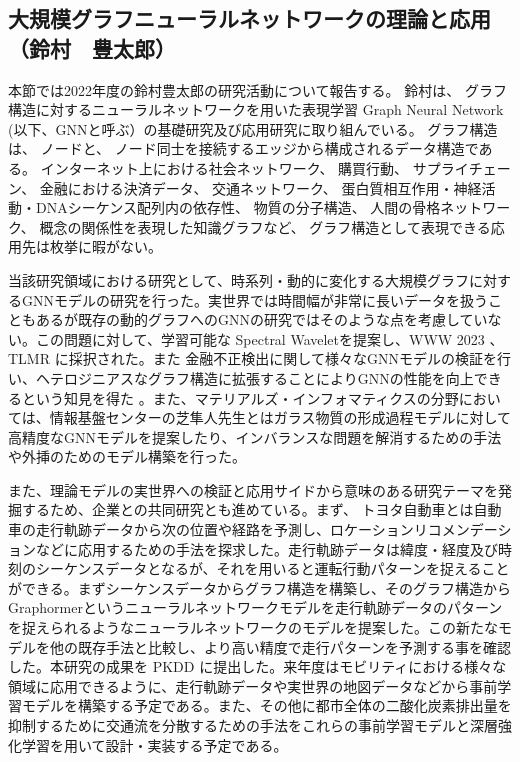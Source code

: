 
\subsection{大規模グラフニューラルネットワークの理論と応用（鈴村　豊太郎）}

本節では2022年度の鈴村豊太郎の研究活動について報告する。 鈴村は、 グラフ構造に対するニューラルネットワークを用いた表現学習 Graph Neural Network (以下、GNNと呼ぶ）の基礎研究及び応用研究に取り組んでいる。 グラフ構造は、 ノードと、 ノード同士を接続するエッジから構成されるデータ構造である。 インターネット上における社会ネットワーク、 購買行動、 サプライチェーン、 金融における決済データ、 交通ネットワーク、 蛋白質相互作用・神経活動・DNAシーケンス配列内の依存性、 物質の分子構造、 人間の骨格ネットワーク、 概念の関係性を表現した知識グラフなど、 グラフ構造として表現できる応用先は枚挙に暇がない。
\par
当該研究領域における研究として、時系列・動的に変化する大規模グラフに対するGNNモデルの研究を行った。実世界では時間幅が非常に長いデータを扱うこともあるが既存の動的グラフへのGNNの研究ではそのような点を考慮していない。この問題に対して、学習可能な Spectral Waveletを提案し、WWW 2023 \cite{deft}、 TLMR \cite{feta}に採択された。また 金融不正検出に関して様々なGNNモデルの検証を行い、ヘテロジニアスなグラフ構造に拡張することによりGNNの性能を向上できるという知見を得た \cite{eth-gnn}。また、マテリアルズ・インフォマティクスの分野においては、情報基盤センターの芝隼人先生とはガラス物質の形成過程モデルに対して高精度なGNNモデルを提案したり\cite{botan}、インバランスな問題を解消するための手法  \cite{xsig-limin}や外挿のためのモデル構築を行った\cite{xsig-takashige}。

また、理論モデルの実世界への検証と応用サイドから意味のある研究テーマを発掘するため、企業との共同研究とも進めている。まず、 トヨタ自動車とは自動車の走行軌跡データから次の位置や経路を予測し、ロケーションリコメンデーションなどに応用するための手法を探求した。走行軌跡データは緯度・経度及び時刻のシーケンスデータとなるが、それを用いると運転行動パターンを捉えることができる。まずシーケンスデータからグラフ構造を構築し、そのグラフ構造からGraphormerというニューラルネットワークモデルを走行軌跡データのパターンを捉えられるようなニューラルネットワークのモデルを提案した。この新たなモデルを他の既存手法と比較し、より高い精度で走行パターンを予測する事を確認した。本研究の成果を PKDD \cite{stgtrans}に提出した。来年度はモビリティにおける様々な領域に応用できるように、走行軌跡データや実世界の地図データなどから事前学習モデルを構築する予定である。また、その他に都市全体の二酸化炭素排出量を抑制するために交通流を分散するための手法をこれらの事前学習モデルと深層強化学習を用いて設計・実装する予定である。

